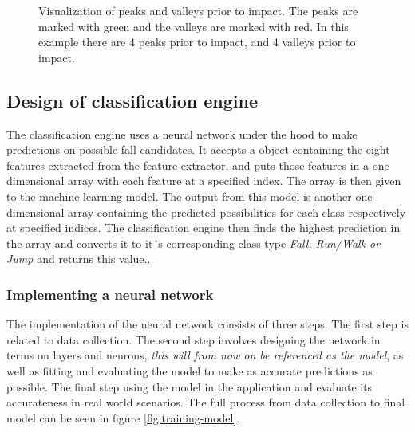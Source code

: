 \documentclass[12pt, a4paper, onecolumn]{article}
\begin{document}
	\begin{figure}[H]
		\centering
		\caption{Visualization of peaks and valleys prior to impact. The peaks are marked with green and the valleys are marked with red. In this example there are 4 peaks prior to impact, and 4 valleys prior to impact.}%
		\label{fig:fall-data-peaks-and-valleys}%
	\end{figure}
	
	
	 \subsection{Design of classification engine}
	 
	 The classification engine uses a neural network under the hood to make predictions on possible fall candidates. It accepts a object containing the eight features extracted from the feature extractor, and puts those features in a one dimensional array with each feature at a specified index. The array is then given to the machine learning model. The output from this model is another one dimensional array containing the predicted possibilities for each class respectively at specified indices. The classification engine then finds the highest prediction in the array and converts it to it´s corresponding class type \textit{Fall, Run/Walk or Jump} and returns this value..
	 
	\subsubsection{Implementing a neural network}
	The implementation of the neural network consists of three steps. The first step is related to data collection. The second step involves designing the network in terms on layers and neurons, \textit{this will from now on be referenced as the model}, as well as fitting and evaluating the model to make as accurate predictions as possible. The final step using the model in the application and evaluate its accurateness in real world scenarios. The full process from data collection to final model can be seen in figure \ref{fig:training-model}.
	
\end{document}
